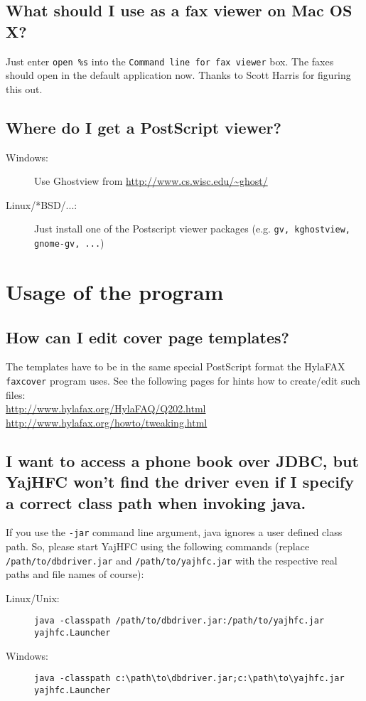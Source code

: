 \documentclass[a4paper,10pt]{scrartcl}
\begin{document}
\subsection{What should I use as a fax viewer on Mac OS X?}
Just enter \verb.open %s. into the \texttt{Command line for fax viewer} box.
The faxes should open in the default application now.
Thanks to Scott Harris for figuring this out.


\subsection{Where do I get a PostScript viewer?}
\begin{description}
\item[Windows:] Use Ghostview from \url{http://www.cs.wisc.edu/~ghost/}
\item[Linux/*BSD/...:] Just install one of the Postscript viewer packages
                (e.g. \texttt{gv, kghostview, gnome-gv, ...})
\end{description}
		
\section{Usage of the program}	

\subsection{How can I edit cover page templates?}
The templates have to be in the same special PostScript format the HylaFAX
\texttt{faxcover} program uses. See the following pages for hints how to create/edit
such files: \\
\url{http://www.hylafax.org/HylaFAQ/Q202.html}\\
\url{http://www.hylafax.org/howto/tweaking.html}\\

\subsection{I want to access a phone book over JDBC, but YajHFC won't find the driver even if I specify a correct class path when invoking java.}

If you use the \texttt{-jar} command line argument, java ignores a user defined class path.
So, please start YajHFC using the following commands (replace \texttt{/path/to/dbdriver.jar} and \texttt{/path/to/yajhfc.jar} with the respective real paths and file names of course):
\begin{description}
\item [Linux/Unix:] \verb#java -classpath /path/to/dbdriver.jar:/path/to/yajhfc.jar yajhfc.Launcher#
\item [Windows:] \verb#java -classpath c:\path\to\dbdriver.jar;c:\path\to\yajhfc.jar yajhfc.Launcher#
\end{description}
\end{document}
